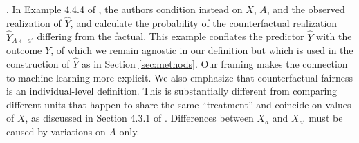 .  In
Example 4.4.4 of \cite{pearl:16}, the authors condition instead on
$X$, $A$, and the observed realization of $\hat Y$, and calculate the
probability of the counterfactual realization $\hat Y_{A \leftarrow
  a'}$ differing from the factual.
This example conflates the predictor $\hat Y$ with the outcome $Y$, of
which we remain agnostic in our definition but which is used in the
construction of $\hat Y$ as in Section \ref{sec:methods}. Our framing
makes the connection to machine learning more explicit.
We also emphasize that counterfactual fairness is an
individual-level definition. This is substantially different
from comparing different units that happen to share the
same ``treatment'' and coincide on values of $X$, as discussed in
Section 4.3.1 of \citep{pearl:16}. Differences between $X_a$ and $X_{a'}$
must be caused by variations on $A$ only.


